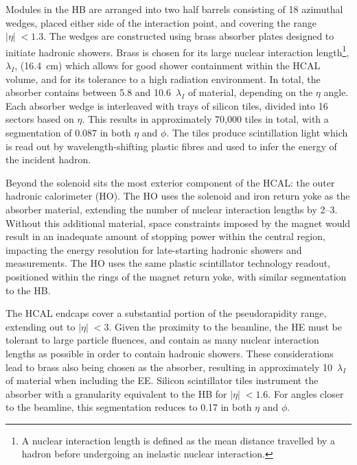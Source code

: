 Modules in the HB are arranged into two half barrels consisting of 18 azimuthal wedges, placed either side of the interaction point, and covering the range $|\eta|\;<1.3$. The wedges are constructed using brass absorber plates designed to initiate hadronic showers. Brass is chosen for its large nuclear interaction length\footnote{A nuclear interaction length is defined as the mean distance travelled by a hadron before undergoing an inelastic nuclear interaction.}, $\lambda_{I}$, (16.4~cm) which allows for good shower containment within the HCAL volume, and for its tolerance to a high radiation environment. In total, the absorber contains between 5.8 and 10.6~$\lambda_{I}$ of material, depending on the $\eta$ angle. Each absorber wedge is interleaved with trays of silicon tiles, divided into 16 sectors based on $\eta$. This results in approximately 70,000 tiles in total, with a segmentation of 0.087 in both $\eta$ and $\phi$. The tiles produce scintillation light which is read out by wavelength-shifting plastic fibres and used to infer the energy of the incident hadron.

Beyond the solenoid sits the most exterior component of the HCAL: the outer hadronic calorimeter (HO). The HO uses the solenoid and iron return yoke as the absorber material, extending the number of nuclear interaction lengths by 2--3. Without this additional material, space constraints imposed by the magnet would result in an inadequate amount of stopping power within the central region, impacting the energy resolution for late-starting hadronic showers and \met measurements. The HO uses the same plastic scintillator technology readout, positioned within the rings of the magnet return yoke, with similar segmentation to the HB.

The HCAL endcaps cover a substantial portion of the pseudorapidity range, extending out to $|\eta|\;<3$. Given the proximity to the beamline, the HE must be tolerant to large particle fluences, and contain as many nuclear interaction lengths as possible in order to contain hadronic showers. These considerations lead to brass also being chosen as the absorber, resulting in approximately 10~$\lambda_{I}$ of material when including the EE. Silicon scintillator tiles instrument the absorber with a granularity equivalent to the HB for $|\eta|\;<1.6$. For angles closer to the beamline, this segmentation reduces to 0.17 in both $\eta$ and $\phi$.

